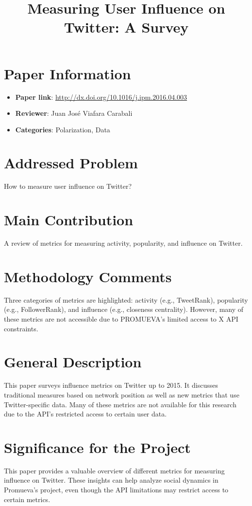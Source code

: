 \documentclass{article}
\title{Measuring User Influence on Twitter: A Survey}
\author{}
\date{}
\begin{document}
\maketitle

\section*{Paper Information}
\begin{itemize}
    \item \textbf{Paper link}: \url{http://dx.doi.org/10.1016/j.ipm.2016.04.003}
    \item \textbf{Reviewer}: Juan José Viafara Carabali
    \item \textbf{Categories}: Polarization, Data
\end{itemize}

\section*{Addressed Problem}
How to measure user influence on Twitter?

\section*{Main Contribution}
A review of metrics for measuring activity, popularity, and influence on Twitter.

\section*{Methodology Comments}
Three categories of metrics are highlighted: activity (e.g., TweetRank), popularity (e.g., FollowerRank), and influence (e.g., closeness centrality). However, many of these metrics are not accessible due to PROMUEVA's limited access to X API constraints.

\section*{General Description}
This paper surveys influence metrics on Twitter up to 2015. It discusses traditional measures based on network position as well as new metrics that use Twitter-specific data. Many of these metrics are not available for this research due to the API's restricted access to certain user data.

\section*{Significance for the Project}
This paper provides a valuable overview of different metrics for measuring influence on Twitter. These insights can help analyze social dynamics in Promueva's project, even though the API limitations may restrict access to certain metrics.
\end{document}
